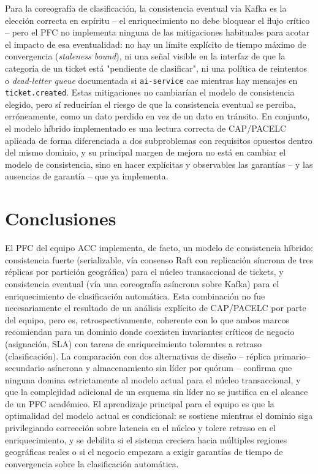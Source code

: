 \documentclass[11pt,a4paper]{article}
\begin{document}
Para la coreograf\'ia de clasificaci\'on, la consistencia eventual v\'ia Kafka es la elecci\'on
correcta en esp\'iritu -- el enriquecimiento no debe bloquear el flujo cr\'itico -- pero el PFC no
implementa ninguna de las mitigaciones habituales para acotar el impacto de esa eventualidad: no
hay un l\'imite expl\'icito de tiempo m\'aximo de convergencia (\emph{staleness bound}), ni una
se\~nal visible en la interfaz de que la categor\'ia de un ticket est\'a "pendiente de
clasificar", ni una pol\'itica de reintentos o \emph{dead-letter queue} documentada si
\texttt{ai-service} cae mientras hay mensajes en \texttt{ticket.created}. Estas mitigaciones no
cambiar\'ian el modelo de consistencia elegido, pero s\'i reducir\'ian el riesgo de que la
consistencia eventual se perciba, err\'oneamente, como un dato perdido en vez de un dato en
tr\'ansito. En conjunto, el modelo h\'ibrido implementado es una lectura correcta de CAP/PACELC
aplicada de forma diferenciada a dos subproblemas con requisitos opuestos dentro del mismo
dominio, y su principal margen de mejora no est\'a en cambiar el modelo de consistencia, sino en
hacer expl\'icitas y observables las garant\'ias -- y las ausencias de garant\'ia -- que ya
implementa.

\section{Conclusiones}

El PFC del equipo ACC implementa, de facto, un modelo de consistencia h\'ibrido: consistencia
fuerte (serializable, v\'ia consenso Raft con replicaci\'on s\'incrona de tres r\'eplicas por
partici\'on geogr\'afica) para el n\'ucleo transaccional de tickets, y consistencia eventual (v\'ia
una coreograf\'ia as\'incrona sobre Kafka) para el enriquecimiento de clasificaci\'on autom\'atica.
Esta combinaci\'on no fue necesariamente el resultado de un an\'alisis expl\'icito de CAP/PACELC
por parte del equipo, pero es, retrospectivamente, coherente con lo que ambos marcos recomiendan
para un dominio donde coexisten invariantes cr\'iticos de negocio (asignaci\'on, SLA) con tareas de
enriquecimiento tolerantes a retraso (clasificaci\'on). La comparaci\'on con dos alternativas de
dise\~no -- r\'eplica primario--secundario as\'incrona y almacenamiento sin l\'ider por qu\'orum --
confirma que ninguna domina estrictamente al modelo actual para el n\'ucleo transaccional, y que la
complejidad adicional de un esquema sin l\'ider no se justifica en el alcance de un PFC
acad\'emico. El aprendizaje principal para el equipo es que la optimalidad del modelo actual es
condicional: se sostiene mientras el dominio siga privilegiando correcci\'on sobre latencia en el
n\'ucleo y tolere retraso en el enriquecimiento, y se debilita si el sistema creciera hacia
m\'ultiples regiones geogr\'aficas reales o si el negocio empezara a exigir garant\'ias de tiempo
de convergencia sobre la clasificaci\'on autom\'atica.
\end{document}

